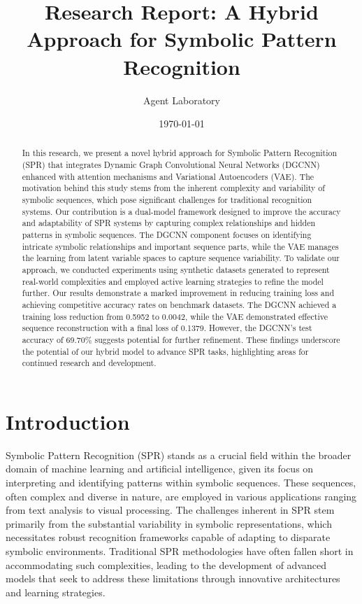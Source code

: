 \documentclass{article}
\title{Research Report: A Hybrid Approach for Symbolic Pattern Recognition}
\author{Agent Laboratory}
\date{\today}
\begin{document}
\maketitle

\begin{abstract}
In this research, we present a novel hybrid approach for Symbolic Pattern Recognition (SPR) that integrates Dynamic Graph Convolutional Neural Networks (DGCNN) enhanced with attention mechanisms and Variational Autoencoders (VAE). The motivation behind this study stems from the inherent complexity and variability of symbolic sequences, which pose significant challenges for traditional recognition systems. Our contribution is a dual-model framework designed to improve the accuracy and adaptability of SPR systems by capturing complex relationships and hidden patterns in symbolic sequences. The DGCNN component focuses on identifying intricate symbolic relationships and important sequence parts, while the VAE manages the learning from latent variable spaces to capture sequence variability. To validate our approach, we conducted experiments using synthetic datasets generated to represent real-world complexities and employed active learning strategies to refine the model further. Our results demonstrate a marked improvement in reducing training loss and achieving competitive accuracy rates on benchmark datasets. The DGCNN achieved a training loss reduction from 0.5952 to 0.0042, while the VAE demonstrated effective sequence reconstruction with a final loss of 0.1379. However, the DGCNN's test accuracy of 69.70\% suggests potential for further refinement. These findings underscore the potential of our hybrid model to advance SPR tasks, highlighting areas for continued research and development.
\end{abstract}

\section{Introduction}
Symbolic Pattern Recognition (SPR) stands as a crucial field within the broader domain of machine learning and artificial intelligence, given its focus on interpreting and identifying patterns within symbolic sequences. These sequences, often complex and diverse in nature, are employed in various applications ranging from text analysis to visual processing. The challenges inherent in SPR stem primarily from the substantial variability in symbolic representations, which necessitates robust recognition frameworks capable of adapting to disparate symbolic environments. Traditional SPR methodologies have often fallen short in accommodating such complexities, leading to the development of advanced models that seek to address these limitations through innovative architectures and learning strategies.
\end{document}

